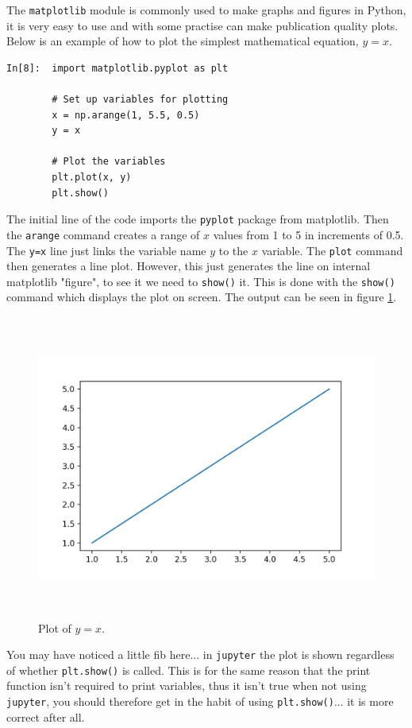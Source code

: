 The {\tt matplotlib} module is commonly used to make graphs and figures in Python, it is very easy to use and with some practise can make publication quality plots. Below is an example of how to plot the simplest mathematical equation, $y=x$.
\begin{lstlisting}[style=PY]
In[8]:  import matplotlib.pyplot as plt

        # Set up variables for plotting
        x = np.arange(1, 5.5, 0.5)
        y = x
        
        # Plot the variables
        plt.plot(x, y)
        plt.show()
\end{lstlisting}
The initial line of the code imports the {\tt pyplot} package from matplotlib. Then the \texttt{arange} command creates a range of $x$ values from 1 to 5 in increments of 0.5. The \texttt{y=x} line just links the variable name $y$ to the $x$ variable. The \texttt{plot} command then generates a line plot. However, this just generates the line on internal matplotlib "figure", to see it we need to \texttt{show()} it. This is done with the \texttt{show()} command which displays the plot on screen. The output can be seen in figure \ref{fig:pyx}.

\begin{figure}[H]
	\centering
	\includegraphics[height=10cm]{Figures/plotyx.png}
\caption{Plot of $y=x$.}
\label{fig:pyx}
\end{figure}

You may have noticed a little fib here... in \texttt{jupyter} the plot is shown regardless of whether {\tt plt.show()} is called. This is for the same reason that the print function isn't required to print variables, thus it isn't true when not using \texttt{jupyter}, you should therefore get in the habit of using {\tt plt.show()}... it is more correct after all.

